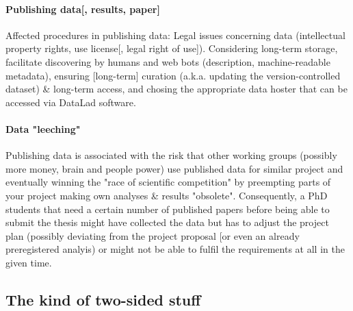 \paragraph{Publishing data[, results, paper]}





Affected procedures in publishing data:
Legal issues concerning data (intellectual property rights, use license[, legal
right of use]).
Considering long-term storage, facilitate discovering by humans and web bots
(description, machine-readable metadata), ensuring [long-term] curation (a.k.a.
updating the version-controlled dataset) \& long-term access, and chosing the
appropriate data hoster that can be accessed via DataLad software.


\paragraph{Data "leeching"}
%
Publishing data is associated with the risk that other working groups (possibly
more money, brain and people power) use published data for similar project and
eventually winning the "race of scientific competition" by preempting parts of
your project making own analyses \& results "obsolete".
%
Consequently, a PhD students that need a certain number of published papers
before being able to submit the thesis might have collected the data but has to
adjust the project plan (possibly deviating from the project proposal [or even
an already preregistered analyis) or might not be able to fulfil the
requirements at all in the given time.




\subsection{The kind of two-sided stuff}

